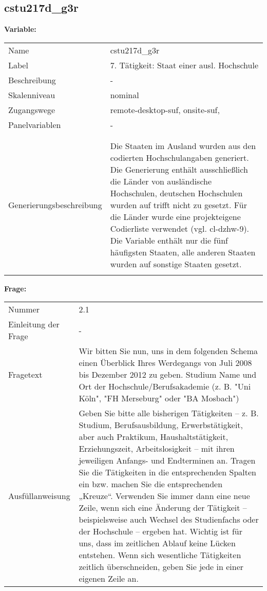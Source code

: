 	
	
	\subsection{cstu217d\_g3r}
	\label{subSection:cstu217d_g3r}

	\noindent\textbf{Variable:}\\
		\begin{tabular}{lL{11.3cm}}
			\label{tableVariable:cstu217d_g3r}
			Name & cstu217d\_g3r \\
			Label & 7. Tätigkeit: Staat einer ausl. Hochschule \\
			Beschreibung & - \\
			Skalenniveau & nominal \\
			Zugangswege &
				remote-desktop-suf,
				onsite-suf,
 \\
			Panelvariablen & -
			 \\
			 \\
 \\
					Generierungsbeschreibung & Die Staaten im Ausland wurden aus den codierten Hochschulangaben generiert. Die Generierung enthält ausschließlich die Länder von ausländische Hochschulen, deutschen Hochschulen wurden auf trifft nicht zu gesetzt. Für die Länder wurde eine projekteigene Codierliste verwendet (vgl. cl-dzhw-9). Die Variable enthält nur die fünf häufigsten Staaten, alle anderen Staaten wurden auf sonstige Staaten gesetzt. 
				 \\	
			 \\
		\end{tabular}

		\vspace*{1 cm}
		\noindent\textbf{Frage:}\\
		\begin{tabular}{lL{11.3cm}}
			\label{tableQuestion:cstu217d_g3r}
			Nummer & 2.1 \\
			Einleitung der Frage & - \\
			Fragetext & Wir bitten Sie nun, uns in dem folgenden Schema einen Überblick Ihres Werdegangs von Juli 2008 bis Dezember 2012 zu geben.
Studium
Name und Ort der Hochschule/Berufsakademie
(z. B. "Uni Köln", "FH Merseburg" oder "BA Mosbach") \\
			Ausfüllanweisung & Geben Sie bitte alle bisherigen Tätigkeiten – z. B. Studium, Berufsausbildung, Erwerbstätigkeit, aber auch Praktikum, Haushaltstätigkeit,
Erziehungszeit, Arbeitslosigkeit – mit ihren jeweiligen Anfangs- und Endterminen an. Tragen Sie die Tätigkeiten in die entsprechenden Spalten ein bzw. machen Sie die entsprechenden „Kreuze“. Verwenden Sie immer dann eine neue Zeile, wenn sich eine Änderung der Tätigkeit – beispielsweise auch Wechsel des Studienfachs oder der Hochschule – ergeben hat. Wichtig ist für uns, dass im zeitlichen Ablauf keine Lücken entstehen. Wenn sich wesentliche Tätigkeiten zeitlich überschneiden, geben Sie jede in einer eigenen Zeile an. \\
		\end{tabular}






